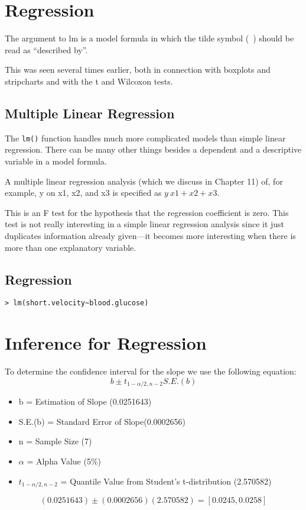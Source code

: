\documentclass[12pt, a4paper]{report}
\theoremstyle{plain}
\theoremstyle{definition}
\theoremstyle{remark}
\begin{document}
\section{Regression}

The argument to lm is a model formula in which the tilde symbol
(~) should be read as ``described by”.


This was seen several times earlier, both in connection with
boxplots and stripcharts and with the t and Wilcoxon tests.



\subsection{Multiple Linear Regression}
The \texttt{lm()} function handles much more
complicated models than simple linear regression. There can be many other things besides a dependent and a descriptive variable in a model formula.

A multiple linear regression analysis (which we discuss in Chapter
11) of, for example, y on x1, x2, and x3 is specified as $y ~ x1 +
x2 + x3$.


This is an F test for the hypothesis that the regression coefficient is zero. This test is not really interesting in a
simple linear regression analysis since it just duplicates information already given—it becomes more interesting when there is more than one explanatory variable.

\subsection{Regression}

\begin{verbatim}
> lm(short.velocity~blood.glucose)
\end{verbatim}

\section{Inference for Regression}
To determine the confidence interval for the slope we use the
following equation:
\begin{equation}
b \pm t_{1-\alpha/2,n-2} S.E.(b)
\end{equation}

\begin{itemize}
\item b = Estimation of Slope (0.0251643) \item S.E.(b) = Standard
Error of Slope(0.0002656) \item n = Sample Size (7) \item $\alpha$
= Alpha Value (5\%) \item $t_{1-\alpha/2,n-2}$ = Quantile Value
from Student’s t-distribution (2.570582)
\end{itemize}

\begin{equation}
(0.0251643) \pm (0.0002656)(2.570582) = [ 0.0245,0.0258 ]
\end{equation}











%
\end{document}
